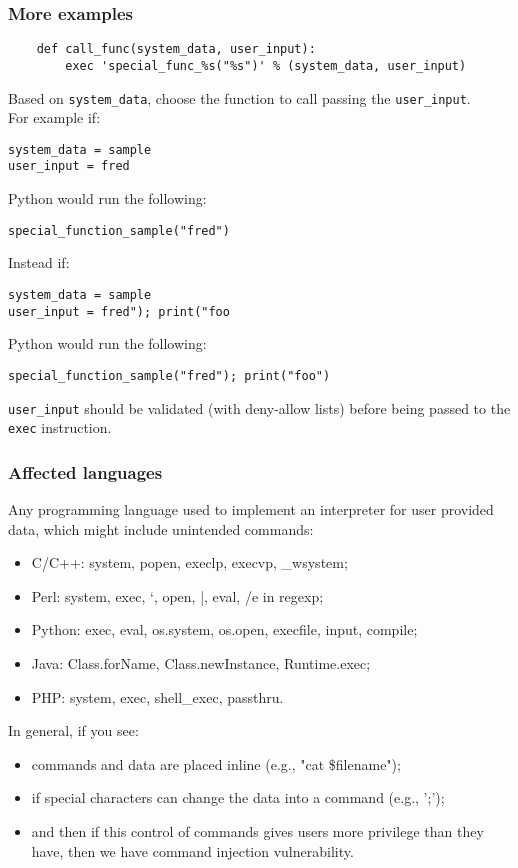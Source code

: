 \documentclass[a4paper, 10pt, titlepage]{article}
\begin{document}
\subsubsection*{More examples}
\begin{lstlisting}
	def call_func(system_data, user_input):
		exec 'special_func_%s("%s")' % (system_data, user_input)
\end{lstlisting}
Based on \lstinline|system_data|, choose the function to call passing the \lstinline|user_input|. \\
For example if:
\begin{verbatim}
system_data = sample
user_input = fred
\end{verbatim}
Python would run the following:
\begin{verbatim}
special_function_sample("fred")
\end{verbatim}
Instead if:
\begin{verbatim}
system_data = sample
user_input = fred"); print("foo
\end{verbatim}
Python would run the following:
\begin{verbatim}
special_function_sample("fred"); print("foo")
\end{verbatim}
\lstinline|user_input| should be validated (with deny-allow lists) before being passed to the \lstinline|exec| instruction.

\subsubsection*{Affected languages}
Any programming language used to implement an interpreter for user provided data, which might include unintended commands:
\begin{itemize}
\item C/C++: system, popen, execlp, execvp, \_wsystem;
\item Perl: system, exec, `, open, |, eval, /e in regexp;
\item Python: exec, eval, os.system, os.open, execfile, input, compile;
\item Java: Class.forName, Class.newInstance, Runtime.exec;
\item PHP: system, exec, shell\_exec, passthru.
\end{itemize}
In general, if you see:
\begin{itemize}
\item commands and data are placed inline (e.g., "cat \$filename");
\item if special characters can change the data into a command (e.g., ';');
\item  and then if this control of commands gives users more privilege than they have, then we have command injection vulnerability.
\end{itemize}
\end{document}
